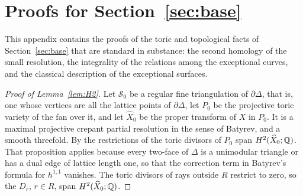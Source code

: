 \section{Proofs for Section~\ref{sec:base}}\label{app:base}

This appendix contains the proofs of the toric and topological facts of Section~\ref{sec:base} that are standard in
substance: the second homology of the small resolution, the integrality of the relations among the exceptional curves,
and the classical description of the exceptional surfaces.

\begin{proof}[Proof of Lemma~\ref{lem:H2}]
Let $\mathcal S_0$ be a regular fine triangulation of $\partial\Delta$, that is, one whose vertices are all the lattice
points of $\partial\Delta$, let $P_0$ be the projective toric variety of the fan over it, and let $\widehat X_0$ be the
proper transform of $X$ in $P_0$. It is a maximal projective crepant partial resolution in the sense of Batyrev, and a
smooth threefold. By \cite[Prop.~8.3]{Paper4} the restrictions of the toric divisors of $P_0$ span $H^2(\widehat X_0;\mathbb Q)$.
That proposition applies because every two-face of $\Delta$ is a unimodular triangle or has a dual edge of lattice length
one, so that the correction term in Batyrev's formula for $h^{1,1}$ vanishes. The toric divisors of rays outside $R$
restrict to zero, so the $D_r$, $r\in R$, span $H^2(\widehat X_0;\mathbb Q)$.


\end{proof}
